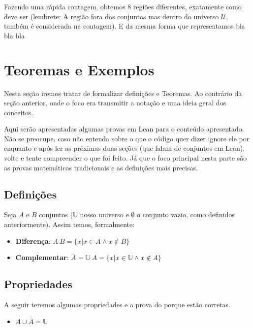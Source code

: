     Fazendo uma rápida contagem, obtemos $8$ regiões diferentes, exatamente como deve ser (lembrete: A região fora dos conjuntos mas dentro do universo $\mathcal U$, também é considerada na contagem). E da mesma forma que representamos bla bla bla

\section{Teoremas e Exemplos}
    
    Nesta seção iremos tratar de formalizar definições e Teoremas. Ao contrário da seção anterior, onde o foco era transmitir a notação e uma ideia geral dos conceitos.
    
    Aqui serão apresentadas algumas provas em Lean para o conteúdo apresentado. Não se preocupe, caso não entenda sobre o que o código quer dizer ignore ele por enquanto e após ler as próximas duas seções (que falam de conjuntos em Lean), volte e tente compreender o que foi feito. Já que o foco principal nesta parte são as provas matemáticas tradicionais e as definições mais precisas.
    
\subsection{Definições}

    Seja $A$ e $B$ conjuntos ($\mathbb{U}$ nosso universo e $\emptyset$ o conjunto vazio, como definidos anteriormente). Assim temos, formalmente:

    \begin{itemize}
  
        \item \textbf{Diferença}: $A \ B = \{x | x \in A \land x \notin B\}$
    
        \item \textbf{Complementar}: $\overline A = \mathbb{U} \ A = \{x | x \in \mathbb{U} \land x \notin A\}$
    \end{itemize}    

\subsection{Propriedades}
    
    A seguir teremos algumas propriedades e a prova do porque estão corretas.
    
    \begin{itemize}  
        \item $A \cup \overline A = \mathbb{U}$
    \end{itemize} 
    
